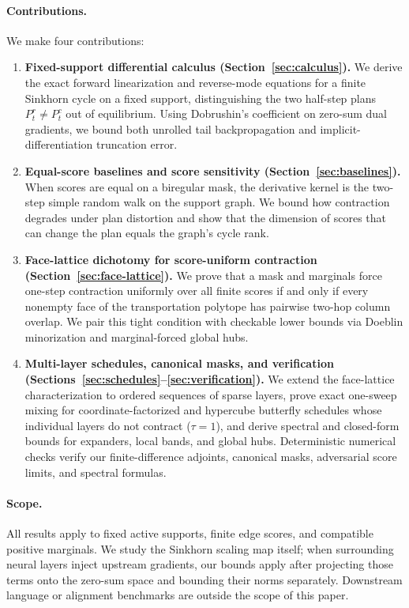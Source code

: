 \documentclass[10pt]{article}
\begin{document}
\paragraph{Contributions.}
We make four contributions:
\begin{enumerate}[leftmargin=1.5em]
  \item \textbf{Fixed-support differential calculus (Section~\ref{sec:calculus}).} We derive the exact forward linearization and reverse-mode equations for a finite Sinkhorn cycle on a fixed support, distinguishing the two half-step plans $P_t^r \neq P_t^c$ out of equilibrium. Using Dobrushin's coefficient on zero-sum dual gradients, we bound both unrolled tail backpropagation and implicit-differentiation truncation error.
  \item \textbf{Equal-score baselines and score sensitivity (Section~\ref{sec:baselines}).} When scores are equal on a biregular mask, the derivative kernel is the two-step simple random walk on the support graph. We bound how contraction degrades under plan distortion and show that the dimension of scores that can change the plan equals the graph's cycle rank.
  \item \textbf{Face-lattice dichotomy for score-uniform contraction (Section~\ref{sec:face-lattice}).} We prove that a mask and marginals force one-step contraction uniformly over all finite scores if and only if every nonempty face of the transportation polytope has pairwise two-hop column overlap. We pair this tight condition with checkable lower bounds via Doeblin minorization and marginal-forced global hubs.
  \item \textbf{Multi-layer schedules, canonical masks, and verification (Sections~\ref{sec:schedules}--\ref{sec:verification}).} We extend the face-lattice characterization to ordered sequences of sparse layers, prove exact one-sweep mixing for coordinate-factorized and hypercube butterfly schedules whose individual layers do not contract ($\tau = 1$), and derive spectral and closed-form bounds for expanders, local bands, and global hubs. Deterministic numerical checks verify our finite-difference adjoints, canonical masks, adversarial score limits, and spectral formulas.
\end{enumerate}

\paragraph{Scope.}
All results apply to fixed active supports, finite edge scores, and compatible positive marginals. We study the Sinkhorn scaling map itself; when surrounding neural layers inject upstream gradients, our bounds apply after projecting those terms onto the zero-sum space and bounding their norms separately. Downstream language or alignment benchmarks are outside the scope of this paper.
\end{document}
